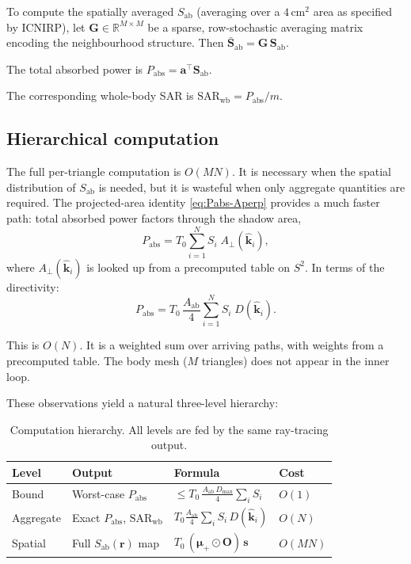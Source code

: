 \documentclass[11pt,a4paper]{article}
\theoremstyle{definition}      %
\newcommand{\khat}{\hat{\bm{k}}}
\newcommand{\rr}{\mathbf{r}}
\newcommand{\Sab}{S_{\mathrm{ab}}}
\newcommand{\Aab}{A_{\mathrm{ab}}}
\newcommand{\Aperp}{A_{\perp}}
\newcommand{\SARwb}{\mathrm{SAR}_{\mathrm{wb}}}
\begin{document}
To compute the spatially averaged $\Sab$ (averaging over a
$4\,\text{cm}^2$ area as specified by ICNIRP), let $\mathbf{G}\in\mathbb{R}^{M\times M}$ be a sparse,
row-stochastic averaging matrix encoding the neighbourhood structure.
Then $\bar{\mathbf{S}}_{\mathrm{ab}}=\mathbf{G}\,\mathbf{S}_{\mathrm{ab}}$.

The total absorbed power is $P_{\mathrm{abs}}=\mathbf{a}^\top\mathbf{S}_{\mathrm{ab}}$.

The corresponding whole-body SAR is $\SARwb = P_{\mathrm{abs}}/m$.

\subsection{Hierarchical computation}\label{sec:hierarchy}

The full per-triangle computation is $O(MN)$. It is necessary when the
spatial distribution of $\Sab$ is needed, but it is wasteful when only
aggregate quantities are required.  The projected-area identity
\cref{eq:Pabs-Aperp} provides a much faster path: total absorbed
power factors through the shadow area,
\begin{equation}\label{eq:Pabs-lookup}
  P_{\mathrm{abs}} = T_0\sum_{i=1}^{N}S_i\;\Aperp(\khat_i),
\end{equation}
where $\Aperp(\khat_i)$ is looked up from a precomputed table on
$S^2$.  In terms of the directivity:
\begin{equation}\label{eq:Pabs-D-multi}
  \boxed{P_{\mathrm{abs}} = T_0\,\frac{\Aab}{4}
    \sum_{i=1}^{N}S_i\;D(\khat_i).}
\end{equation}

This is $O(N)$. It is a weighted sum over arriving paths, with weights from
a precomputed table.  The body mesh ($M$ triangles) does not appear in
the inner loop.

These observations yield a natural three-level hierarchy:

\begin{table}[!htbp]
\centering
\caption{Computation hierarchy.  All levels are fed by the same
  ray-tracing output.}\label{tab:hierarchy}
\begin{tabular}{llll}
\toprule
Level & Output & Formula & Cost \\
\midrule
Bound     & Worst-case $P_{\mathrm{abs}}$
  & $\le T_0\,\frac{\Aab\,D_{\max}}{4}\sum_i S_i$
  & $O(1)$ \\[4pt]
Aggregate & Exact $P_{\mathrm{abs}}$, $\SARwb$
  & $T_0\frac{\Aab}{4}\sum_i S_i\,D(\khat_i)$
  & $O(N)$ \\[4pt]
Spatial   & Full $\Sab(\rr)$ map
  & $T_0\,(\bm{\mu}_+\odot\mathbf{O})\,\mathbf{s}$
  & $O(MN)$ \\
\bottomrule
\end{tabular}
\end{table}
\end{document}
